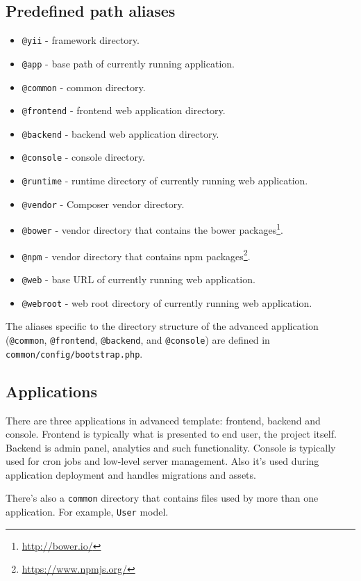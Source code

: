 \subsection{Predefined path aliases}
\begin{itemize}
\item \lstinline|@yii| - framework directory.
\item \lstinline|@app| - base path of currently running application.
\item \lstinline|@common| - common directory.
\item \lstinline|@frontend| - frontend web application directory.
\item \lstinline|@backend| - backend web application directory.
\item \lstinline|@console| - console directory.
\item \lstinline|@runtime| - runtime directory of currently running web application.
\item \lstinline|@vendor| - Composer vendor directory.
\item \lstinline|@bower| - vendor directory that contains the bower packages\footnote{\url{http://bower.io/}}.
\item \lstinline|@npm| - vendor directory that contains npm packages\footnote{\url{https://www.npmjs.org/}}.
\item \lstinline|@web| - base URL of currently running web application.
\item \lstinline|@webroot| - web root directory of currently running web application.
\end{itemize}
The aliases specific to the directory structure of the advanced application
(\lstinline|@common|,  \lstinline|@frontend|, \lstinline|@backend|, and \lstinline|@console|) are defined in \lstinline|common/config/bootstrap.php|.

\subsection{Applications}
There are three applications in advanced template: frontend, backend and console. Frontend is typically what is presented
to end user, the project itself. Backend is admin panel, analytics and such functionality. Console is typically used for
cron jobs and low-level server management. Also it's used during application deployment and handles migrations and assets.

There's also a \lstinline|common| directory that contains files used by more than one application. For example, \lstinline|User| model.


